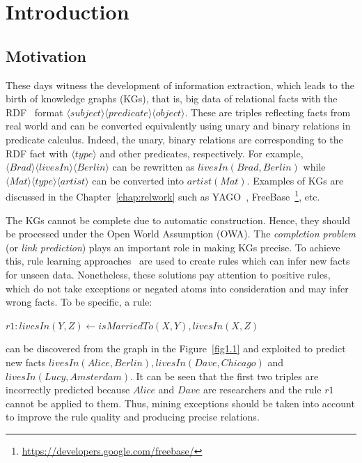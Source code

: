 \chapter{Introduction}
\label{chap:intro}

\section{Motivation}

These days witness the development of information extraction, which leads to the birth of knowledge graphs (KGs), that is, big data of relational facts with the RDF~\cite{ref38} format $\langle subject \rangle \langle predicate \rangle \langle object \rangle$. These are triples reflecting facts from real world and can be converted equivalently using unary and binary relations in predicate calculus. Indeed, the unary, binary relations are corresponding to the RDF fact with $\langle type \rangle$ and other predicates, respectively. For example, $\langle Brad \rangle \langle livesIn \rangle \langle Berlin \rangle$ can be rewritten as $livesIn(Brad, Berlin)$ while $\langle Mat \rangle \langle type \rangle \langle artist \rangle$ can be converted into $artist(Mat)$. Examples of KGs are discussed in the Chapter~\ref{chap:relwork} such as  YAGO~\cite{ref28}, FreeBase~\footnote{\url{https://developers.google.com/freebase/}}, etc.

The KGs cannot be complete due to automatic construction. Hence, they should be processed under the Open World Assumption (OWA). The \textit{completion problem} (or \textit{link prediction}) plays an important role in making KGs precise. To achieve this, rule learning approaches~\cite{ref39, ref10} are used to create rules which can infer new facts for unseen data. Nonetheless, these solutions pay attention to positive rules, which do not take exceptions or negated atoms into consideration and may infer wrong facts. To be specific, a rule:

\begin{center}
$r1: livesIn(Y,Z) \leftarrow isMarriedTo(X,Y), livesIn(X,Z)$
\end{center}

can be discovered from the graph in the Figure~\ref{fig1.1} and exploited to predict new facts $livesIn(Alice, Berlin), livesIn(Dave, Chicago)$ and $livesIn(Lucy, Amsterdam)$. It can be seen that the first two triples are incorrectly predicted because $Alice$ and $Dave$ are researchers and the rule $r1$ cannot be applied to them. Thus, mining exceptions should be taken into account to improve the rule quality and producing precise relations.

